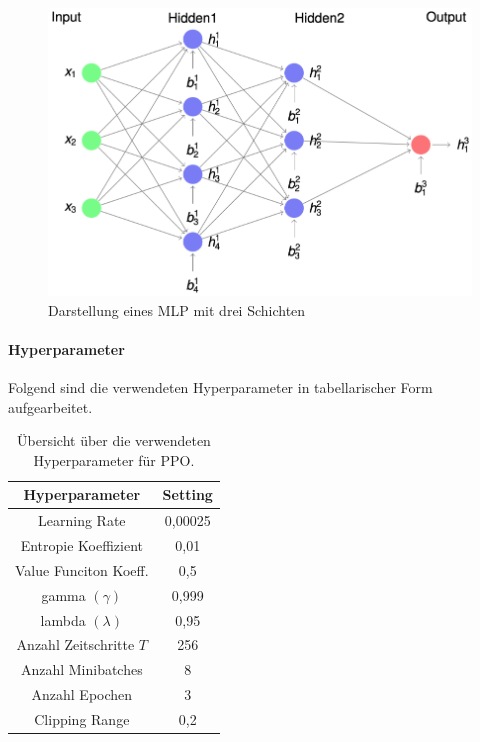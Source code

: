 \begin{figure}[htb!]
    \begin{minipage}{\linewidth}
        \centering
        \includegraphics[scale=0.4]{abb/maucher_bsp_MLP}
        \caption*{Darstellung eines MLP mit drei Schichten \cite{maucher_ki_09}}
        \label{fig:pic_L3_mlp}
    \end{minipage}
\end{figure}
\newpage


\paragraph{Hyperparameter} \label{hyperparameter}
Folgend sind die verwendeten Hyperparameter in tabellarischer Form aufgearbeitet. 

\begin{center}
 \begin{table}[htb!]
 \begin{center}
  \begin{tabular}{c | c}
     Hyperparameter 		& Setting   \\ \hline \hline
     Learning Rate 		& 0,00025 \\ \hline 
     Entropie Koeffizient 	& 0,01 \\ \hline 
     Value Funciton Koeff.	& 0,5 \\ \hline 
     gamma $(\gamma)$	& 0,999 \\ \hline 
     lambda $(\lambda)$	& 0,95 \\ \hline 
     Anzahl Zeitschritte $T$	& 256  \\ \hline 
     Anzahl Minibatches	& 8  \\ \hline 
     Anzahl Epochen		& 3  \\ \hline 
     Clipping Range		& 0,2  \\ \hline 
  \end{tabular}
  \caption{Übersicht über die verwendeten Hyperparameter für PPO.}
  \label{tab:tab_durch_EXP_trainSetting3}
  \end{center}
 \end{table}
\end{center} 

